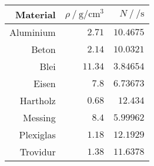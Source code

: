 \begin{tabular}{rrr}
	\toprule
	Material & $\rho ~/~ \si{\gram\per\cm^3}$ & $N ~/~ \si{\per\second}$\\
	\midrule
	Aluminium & $\num{2.71}$ & $\num{10.4675}$ \\
	Beton & $\num{2.14}$ & $\num{10.0321}$ \\
	Blei & $\num{11.34}$ & $\num{3.84654}$ \\
	Eisen & $\num{7.8}$ & $\num{6.73673}$ \\
	Hartholz & $\num{0.68}$ & $\num{12.434}$ \\
	Messing & $\num{8.4}$ & $\num{5.99962}$ \\
	Plexiglas & $\num{1.18}$ & $\num{12.1929}$ \\
	Trovidur & $\num{1.38}$ & $\num{11.6378}$ \\
	\bottomrule
\end{tabular}

